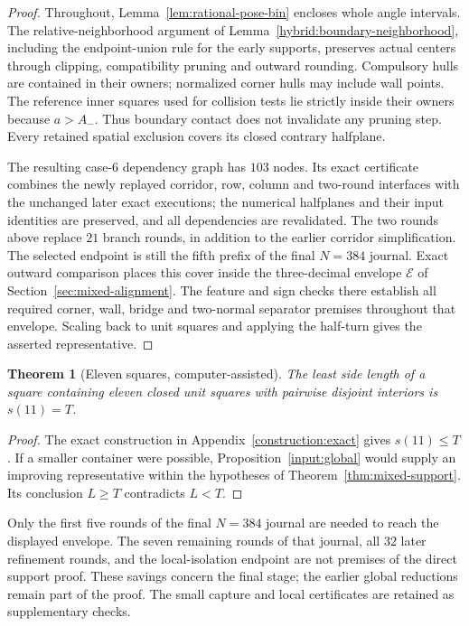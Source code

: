 \documentclass[11pt]{article}
\newtheorem{theorem}{Theorem}[section]
\begin{document}
\begin{proof}
Throughout, Lemma~\ref{lem:rational-pose-bin} encloses whole angle
intervals. The relative-neighborhood argument of
Lemma~\ref{hybrid:boundary-neighborhood}, including the endpoint-union
rule for the early supports, preserves actual centers through clipping,
compatibility pruning and outward rounding. Compulsory hulls are
contained in their owners; normalized corner hulls may include wall
points. The reference inner squares used for collision tests lie
strictly inside their owners because $a>A_-$. Thus boundary contact
does not invalidate any pruning step. Every retained spatial exclusion
covers its closed contrary halfplane.

The resulting case-6 dependency graph has $103$ nodes. Its exact
certificate combines the newly replayed corridor, row, column and
two-round interfaces with the unchanged later exact executions;
the numerical halfplanes and their input identities are preserved,
and all dependencies are revalidated. The two rounds above replace
$21$ branch rounds, in addition to the earlier corridor simplification.
The selected endpoint is still the fifth prefix of the final $N=384$
journal. Exact outward comparison places this cover inside the
three-decimal envelope $\mathcal E$ of
Section~\ref{sec:mixed-alignment}. The feature and sign checks there
establish all required corner, wall, bridge and two-normal separator
premises throughout that envelope. Scaling back to unit squares and
applying the half-turn gives the asserted representative.
\end{proof}

\begin{theorem}[Eleven squares, computer-assisted]\label{thm:optimality}
The least side length of a square containing eleven closed unit squares
with pairwise disjoint interiors is $s(11)=T$.
\end{theorem}
\begin{proof}
The exact construction in Appendix~\ref{construction:exact} gives
$s(11)\le T$. If a smaller container were possible,
Proposition~\ref{input:global} would supply an improving representative
within the hypotheses of Theorem~\ref{thm:mixed-support}. Its conclusion
$L\ge T$ contradicts $L<T$.
\end{proof}

Only the first five rounds of the final $N=384$ journal are needed to
reach the displayed envelope. The seven remaining rounds of that journal,
all $32$ later refinement rounds, and the local-isolation endpoint are
not premises of the direct support proof. These savings concern the final
stage; the earlier global reductions remain part of the proof. The small
capture and local certificates are retained as supplementary checks.
\end{document}
